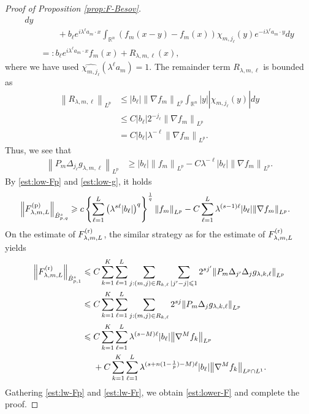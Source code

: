 \documentclass[a4paper,12pt,reqno]{amsart}
\theoremstyle{plain}
\theoremstyle{definition}
\newcommand{\dB}{\dot{B}}
\renewcommand{\leq}{\leqslant}
\renewcommand{\geq}{\geqslant}
\newcommand{\n}[1]{{\left\|#1\right\|}}
\newcommand{\R}{\mathbb{R}}
\newcommand{\Mp}[1]{\left\{#1\right\}}
\renewcommand{\sp}[1]{\left(#1\right)}
\newcommand{\p}{{\rm p}}
\renewcommand{\r}{{\rm r}}
\begin{document}
\begin{proof}[Proof of Proposition \ref{prop:F-Besov}]
\begin{align}
    dy\\
    &\qquad
    +
    b_{\ell}
    e^{i\lambda^\ell a_m\cdot x}
    \int_{\R^n}
    (f_m(x-y)-f_m(x))\chi_{m,j_{\ell}}(y)e^{-i\lambda^\ell a_m\cdot y}
    dy\\
    &
    =:
    b_{\ell}
    e^{i\lambda^\ell a_m\cdot x}
    f_m(x)
    +
    R_{\lambda,m,\ell}(x),
\end{align}
where we have used $\widehat{\chi_{m,j_{\ell}}}(\lambda^\ell a_m)=1$.
The remainder term $R_{\lambda,m,\ell}$ is bounded as
\begin{align}
    \n{R_{\lambda,m,\ell}}_{L^p}
    &\leq 
    |b_{\ell}|\n{\nabla f_m}_{L^p}
    \int_{\R^n} |y||\chi_{m,j_{\ell}}(y)|dy
    \\
    &\leq 
    C|b_{\ell}|2^{-j_{\ell}}\n{\nabla f_m}_{L^p}
    \\
    &= 
    C|b_{\ell}|\lambda^{-\ell}\n{\nabla f_m}_{L^p}.
\end{align}
Thus, we see that 
\begin{align}\label{est:low-g}
    \n{P_m\Delta_{j_{\ell}}g_{\lambda,m,\ell}}_{L^p}
    &
    \geq 
    |b_{\ell}|
    \n{f_m}_{L^p}
    -
    C\lambda^{-\ell}
    |b_{\ell}|
    \n{\nabla f_m}_{L^p}.
\end{align}
By \eqref{est:low-Fp} and \eqref{est:low-g}, it holds
\begin{align}
    \n{F_{\lambda,m,L}^{(\p)}}_{\dB_{p,q}^s}
    \geq{}&
    c
    \Mp{\sum_{\ell=1}^L\sp{\lambda^{s\ell}|b_{\ell}|}^q}^{\frac{1}{q}}
    \n{f_m}_{L^p}
    -
    C
    \sum_{\ell=1}^L
    \lambda^{(s-1)\ell}
    |b_{\ell}|
    \n{\nabla f_m}_{L^p}.
    \label{est:lw-Fp}
\end{align}
On the estimate of $F^{(\r)}_{\lambda,m,L}$,
the similar strategy as for the estimate of $F^{(\r)}_{\lambda,m,L}$ yields
\begin{align}
    \n{F^{(\r)}_{\lambda,m,L}}_{\dB_{p,1}^s}
    \leq{}& 
    C
    \sum_{k=1}^K
    \sum_{\ell=1}^L
    \sum_{j:(m,j) \in R_{k,\ell}}
    \sum_{|j'-j|\leq1}
    2^{sj'}
    \n{P_m\Delta_{j'}\Delta_jg_{\lambda,k,\ell}}_{L^p}\\
    \leq{}& 
    C
    \sum_{k=1}^K
    \sum_{\ell=1}^L
    \sum_{j:(m,j) \in R_{k,\ell}}
    2^{sj}
    \n{P_m\Delta_jg_{\lambda,k,\ell}}_{L^p}\\
    \leq {}&
    C
    \sum_{k=1}^K
    \sum_{\ell=1}^L
    \lambda^{(s-M)\ell}
    |b_{\ell}|
    \n{\nabla^Mf_{k}}_{L^p}
    \\
    &
    +
    C
    \sum_{k=1}^K
    \sum_{\ell=1}^L
    \lambda^{(s+n(1-\frac{1}{p})-M)\ell}
    |b_{\ell}|
    \n{\nabla^Mf_{k}}_{L^p \cap L^1}.
    \label{est:lw-Fr}
\end{align}
Gathering \eqref{est:lw-Fp} and \eqref{est:lw-Fr}, we obtain \eqref{est:lower-F} and complete the proof.
\end{proof}
\end{document}
